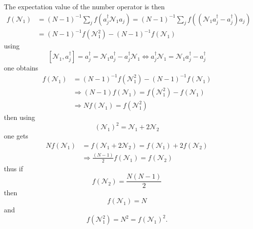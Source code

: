\documentclass[aps,preprint]{revtex4}%
\begin{document}
The expectation value of the number operator is then%
\begin{align}
f\left(  \mathcal{N}_{1}\right)   &  =\left(  N-1\right)  ^{-1}\sum
_{j}f\left(  a_{j}^{\dagger}\mathcal{N}_{1}a_{j}\right)  =\left(  N-1\right)
^{-1}\sum_{j}f\left(  \left(  \mathcal{N}_{1}a_{j}^{\dagger}-a_{j}^{\dagger
}\right)  a_{j}\right) \nonumber\\
&  =\left(  N-1\right)  ^{-1}f\left(  \mathcal{N}_{1}^{2}\right)  -\left(
N-1\right)  ^{-1}f\left(  \mathcal{N}_{1}\right) \nonumber
\end{align}
using
\begin{equation}
\left[  \mathcal{N}_{1},a_{j}^{\dagger}\right]  =a_{j}^{\dagger}%
=\mathcal{N}_{1}a_{j}^{\dagger}-a_{j}^{\dagger}\mathcal{N}_{1}\Leftrightarrow
a_{j}^{\dagger}\mathcal{N}_{1}=\mathcal{N}_{1}a_{j}^{\dagger}-a_{j}^{\dagger}%
\end{equation}
one obtains%
\begin{align}
f\left(  \mathcal{N}_{1}\right)   &  =\left(  N-1\right)  ^{-1}f\left(
\mathcal{N}_{1}^{2}\right)  -\left(  N-1\right)  ^{-1}f\left(  \mathcal{N}%
_{1}\right) \nonumber\\
&  \Rightarrow\left(  N-1\right)  f\left(  \mathcal{N}_{1}\right)  =f\left(
\mathcal{N}_{1}^{2}\right)  -f\left(  \mathcal{N}_{1}\right) \nonumber\\
&  \Rightarrow Nf\left(  \mathcal{N}_{1}\right)  =f\left(  \mathcal{N}_{1}%
^{2}\right)
\end{align}
then using
\begin{equation}
\left(  \mathcal{N}_{1}\right)  ^{2}=\mathcal{N}_{1}+2\mathcal{N}_{2}%
\end{equation}
one gets
\begin{align}
Nf\left(  \mathcal{N}_{1}\right)   &  =f\left(  \mathcal{N}_{1}+2\mathcal{N}%
_{2}\right)  =f\left(  \mathcal{N}_{1}\right)  +2f\left(  \mathcal{N}%
_{2}\right) \nonumber\\
&  \Rightarrow\frac{\left(  N-1\right)  }{2}f\left(  \mathcal{N}_{1}\right)
=f\left(  \mathcal{N}_{2}\right)
\end{align}
thus if
\begin{equation}
f\left(  \mathcal{N}_{2}\right)  =\frac{N\left(  N-1\right)  }{2}%
\end{equation}
then
\begin{equation}
f\left(  \mathcal{N}_{1}\right)  =N
\end{equation}
and
\begin{equation}
f\left(  \mathcal{N}_{1}^{2}\right)  =N^{2}=f\left(  \mathcal{N}_{1}\right)
^{2}.
\end{equation}
\end{document}
